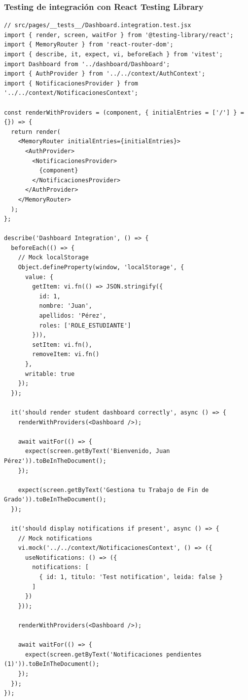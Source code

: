 \documentclass[12pt,a4paper,oneside]{report}
\begin{document}
\subsubsection{Testing de integración con React Testing
Library}\label{testing-de-integraciuxf3n-con-react-testing-library}

\begin{lstlisting}
// src/pages/__tests__/Dashboard.integration.test.jsx
import { render, screen, waitFor } from '@testing-library/react';
import { MemoryRouter } from 'react-router-dom';
import { describe, it, expect, vi, beforeEach } from 'vitest';
import Dashboard from '../dashboard/Dashboard';
import { AuthProvider } from '../../context/AuthContext';
import { NotificacionesProvider } from '../../context/NotificacionesContext';

const renderWithProviders = (component, { initialEntries = ['/'] } = {}) => {
  return render(
    <MemoryRouter initialEntries={initialEntries}>
      <AuthProvider>
        <NotificacionesProvider>
          {component}
        </NotificacionesProvider>
      </AuthProvider>
    </MemoryRouter>
  );
};

describe('Dashboard Integration', () => {
  beforeEach(() => {
    // Mock localStorage
    Object.defineProperty(window, 'localStorage', {
      value: {
        getItem: vi.fn(() => JSON.stringify({
          id: 1,
          nombre: 'Juan',
          apellidos: 'Pérez',
          roles: ['ROLE_ESTUDIANTE']
        })),
        setItem: vi.fn(),
        removeItem: vi.fn()
      },
      writable: true
    });
  });

  it('should render student dashboard correctly', async () => {
    renderWithProviders(<Dashboard />);

    await waitFor(() => {
      expect(screen.getByText('Bienvenido, Juan Pérez')).toBeInTheDocument();
    });

    expect(screen.getByText('Gestiona tu Trabajo de Fin de Grado')).toBeInTheDocument();
  });

  it('should display notifications if present', async () => {
    // Mock notifications
    vi.mock('../../context/NotificacionesContext', () => ({
      useNotifications: () => ({
        notifications: [
          { id: 1, titulo: 'Test notification', leida: false }
        ]
      })
    }));

    renderWithProviders(<Dashboard />);

    await waitFor(() => {
      expect(screen.getByText('Notificaciones pendientes (1)')).toBeInTheDocument();
    });
  });
});
\end{lstlisting}
\end{document}
